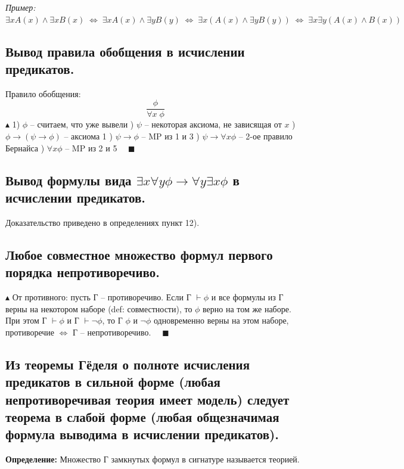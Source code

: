 \textit{Пример:} $\exists x A(x) \land \exists xB(x) \; \Leftrightarrow \; \exists x A(x) \land \exists yB(y) \; \Leftrightarrow \; \exists x (A(x) \land \exists yB(y)) \; \Leftrightarrow \; \exists x\exists y( A(x) \land B(x)) $

\subsection{Вывод правила обобщения в исчислении предикатов.}
Правило обобщения: $$\frac{\phi}{\forall x \;\phi}$$
$\blacktriangle$ 1) $\phi$ -- считаем, что уже вывели
) $\psi$ -- некоторая аксиома, не зависящая от $x$
) $\phi\to(\psi\to\phi)$ -- аксиома 1
) $\psi\to\phi$ -- MP из 1 и 3
) $\psi\to\forall x \phi$ -- 2-ое правило Бернайса
) $\forall x \phi$ -- MP из 2 и 5 $\quad \blacksquare$

\subsection{Вывод формулы вида $\exists x \forall y \phi \to \forall y \exists x \phi$ в исчислении предикатов.}

Доказательство приведено в определениях пункт 12). 

\subsection{Любое совместное множество формул первого порядка непротиворечиво.}
$\blacktriangle$ От противного: пусть Г -- противоречиво. Если Г $\vdash \phi$ и все формулы из Г верны на некотором наборе (def: совместности), то $\phi$ верно на том же наборе. При этом Г $\vdash \phi$ и Г $\vdash \neg\phi$, то Г $\phi$ и $\neg\phi$ одновременно верны на этом наборе, противоречие $\Leftrightarrow$ Г -- непротиворечиво. $\quad \blacksquare$

\subsection{Из теоремы Гёделя о полноте исчисления предикатов в сильной форме (любая непротиворечивая теория имеет модель) следует теорема в слабой форме (любая общезначимая формула выводима в исчислении предикатов).}

\textbf{Определение:} Множество Г замкнутых формул в сигнатуре называется теорией.

